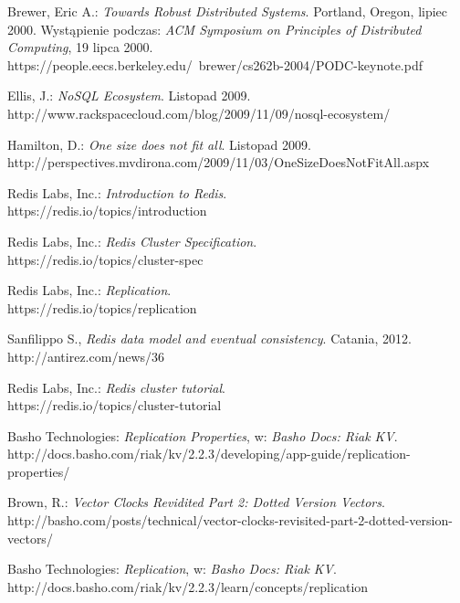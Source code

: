 \begin{thebibliography}{1}

 Brewer, Eric A.: \textit{Towards Robust Distributed Systems}. Portland, Oregon, lipiec 2000. Wystąpienie podczas: \textit{ACM Symposium on Principles of Distributed Computing}, 19 lipca 2000. \\
https://people.eecs.berkeley.edu/~brewer/cs262b-2004/PODC-keynote.pdf

 Ellis, J.: \textit{NoSQL Ecosystem}. Listopad 2009. \\
http://www.rackspacecloud.com/blog/2009/11/09/nosql-ecosystem/

 Hamilton, D.: \textit{One size does not fit all}. Listopad 2009. \\
http://perspectives.mvdirona.com/2009/11/03/OneSizeDoesNotFitAll.aspx

 Redis Labs, Inc.: \textit{Introduction to Redis}. \\
https://redis.io/topics/introduction

 Redis Labs, Inc.: \textit{Redis Cluster Specification}. \\
https://redis.io/topics/cluster-spec

 Redis Labs, Inc.: \textit{Replication}. \\
https://redis.io/topics/replication

 Sanfilippo S., \textit{Redis data model and eventual consistency}. Catania, 2012. \\
http://antirez.com/news/36

 Redis Labs, Inc.: \textit{Redis cluster tutorial}. \\ https://redis.io/topics/cluster-tutorial

 Basho Technologies: \textit{Replication Properties}, w: \textit{Basho Docs: Riak KV}. \\
http://docs.basho.com/riak/kv/2.2.3/developing/app-guide/replication-properties/

 Brown, R.: \textit{Vector Clocks Revidited Part 2: Dotted Version Vectors}. \\
http://basho.com/posts/technical/vector-clocks-revisited-part-2-dotted-version-vectors/

 Basho Technologies: \textit{Replication}, w: \textit{Basho Docs: Riak KV}. \\
http://docs.basho.com/riak/kv/2.2.3/learn/concepts/replication


\end{thebibliography}

